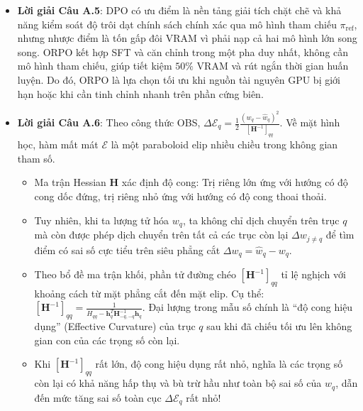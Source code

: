 \begin{itemize}
  \item \textbf{Lời giải Câu A.5}:
  DPO có ưu điểm là nền tảng giải tích chặt chẽ và khả năng kiểm soát độ trôi dạt chính sách chính xác qua mô hình tham chiếu $\pi_{\text{ref}}$, nhưng nhược điểm là tốn gấp đôi VRAM vì phải nạp cả hai mô hình lớn song song. ORPO kết hợp SFT và căn chỉnh trong một pha duy nhất, không cần mô hình tham chiếu, giúp tiết kiệm $50\%$ VRAM và rút ngắn thời gian huấn luyện. Do đó, ORPO là lựa chọn tối ưu khi nguồn tài nguyên GPU bị giới hạn hoặc khi cần tinh chỉnh nhanh trên phần cứng biên.

  \item \textbf{Lời giải Câu A.6}:
  Theo công thức OBS, $\Delta \mathcal{E}_q = \frac{1}{2} \frac{(w_q - \hat{w}_q)^2}{[\mathbf{H}^{-1}]_{qq}}$. Về mặt hình học, hàm mất mát $\mathcal{E}$ là một paraboloid elip nhiều chiều trong không gian tham số.
  \begin{itemize}
    \item Ma trận Hessian $\mathbf{H}$ xác định độ cong: Trị riêng lớn ứng với hướng có độ cong dốc đứng, trị riêng nhỏ ứng với hướng có độ cong thoai thoải.
    \item Tuy nhiên, khi ta lượng tử hóa $w_q$, ta không chỉ dịch chuyển trên trục $q$ mà còn được phép dịch chuyển trên tất cả các trục còn lại $\Delta w_{j \neq q}$ để tìm điểm có sai số cực tiểu trên siêu phẳng cắt $\Delta w_q = \hat{w}_q - w_q$.
    \item Theo bổ đề ma trận khối, phần tử đường chéo $[\mathbf{H}^{-1}]_{qq}$ tỉ lệ nghịch với khoảng cách từ mặt phẳng cắt đến mặt elip. Cụ thể: $[\mathbf{H}^{-1}]_{qq} = \frac{1}{H_{qq} - \mathbf{h}_q^T \mathbf{H}_{-q, -q}^{-1} \mathbf{h}_q}$. Đại lượng trong mẫu số chính là ``độ cong hiệu dụng'' (Effective Curvature) của trục $q$ sau khi đã chiếu tối ưu lên không gian con của các trọng số còn lại.
    \item Khi $[\mathbf{H}^{-1}]_{qq}$ rất lớn, độ cong hiệu dụng rất nhỏ, nghĩa là các trọng số còn lại có khả năng hấp thụ và bù trừ hầu như toàn bộ sai số của $w_q$, dẫn đến mức tăng sai số toàn cục $\Delta \mathcal{E}_q$ rất nhỏ!
  \end{itemize}


\end{itemize}
